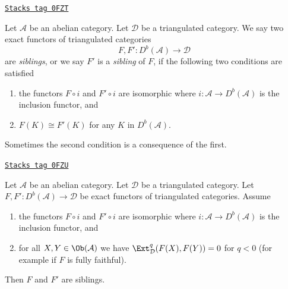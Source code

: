 \begin{definition}[Siblings]
\label{equiv-definition-siblings}
\href{https://stacks.math.columbia.edu/tag/0FZT}{\texttt{Stacks tag 0FZT}}

Let $\mathcal{A}$ be an abelian category. Let $\mathcal{D}$ be a
triangulated category. We say two exact functors of triangulated categories
$$
F, F' : D^b(\mathcal{A}) \longrightarrow \mathcal{D}
$$
are {\it siblings}, or we say $F'$ is a {\it sibling} of $F$,
if the following two conditions are satisfied
\begin{enumerate}
\item the functors $F \circ i$ and $F' \circ i$ are isomorphic
where $i : \mathcal{A} \to D^b(\mathcal{A})$ is the inclusion functor, and
\item $F(K) \cong F'(K)$ for any $K$ in $D^b(\mathcal{A})$.
\end{enumerate}
\end{definition}

Sometimes the second condition is a consequence of the first.

\begin{lemma}
\label{equiv-lemma-sibling-fully-faithful}
\href{https://stacks.math.columbia.edu/tag/0FZU}{\texttt{Stacks tag 0FZU}}

Let $\mathcal{A}$ be an abelian category. Let $\mathcal{D}$ be a
triangulated category. Let
$F, F' : D^b(\mathcal{A}) \longrightarrow \mathcal{D}$
be exact functors of triangulated categories. Assume
\begin{enumerate}
\item the functors $F \circ i$ and $F' \circ i$ are isomorphic
where $i : \mathcal{A} \to D^b(\mathcal{A})$ is the inclusion functor, and
\item for all $X, Y \in \Ob(\mathcal{A})$ we have
$\Ext^q_\mathcal{D}(F(X), F(Y)) = 0$ for $q < 0$ (for example
if $F$ is fully faithful).
\end{enumerate}
Then $F$ and $F'$ are siblings.
\end{lemma}

